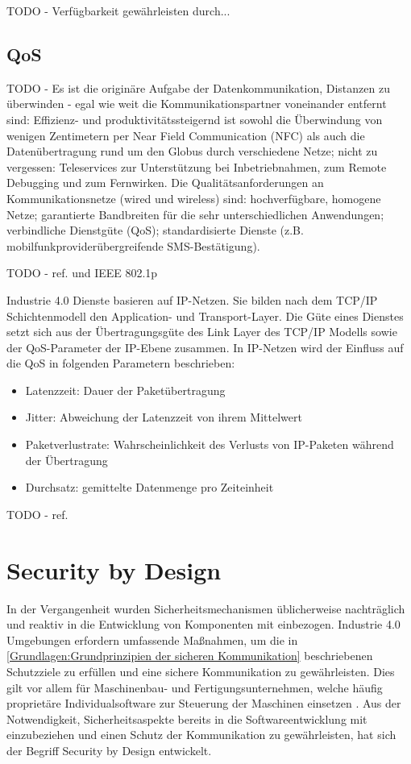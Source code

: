 TODO - Verfügbarkeit gewährleisten durch...

\subsection{\ac{QoS}}
TODO - Es ist die originäre Aufgabe der Datenkommunikation, Distanzen zu überwinden - egal wie weit die Kommunikationspartner voneinander entfernt sind: Effizienz- und produktivitätssteigernd ist sowohl die Überwindung von wenigen Zentimetern per Near Field Communication (NFC) als auch die Datenübertragung rund um den Globus durch verschiedene Netze; nicht zu vergessen: Teleservices zur Unterstützung bei Inbetriebnahmen, zum Remote Debugging und zum Fernwirken. Die Qualitätsanforderungen an Kommunikationsnetze (wired und wireless) sind: hochverfügbare, homogene Netze; garantierte Bandbreiten für die sehr unterschiedlichen Anwendungen; verbindliche Dienstgüte (QoS); standardisierte Dienste (z.B. mobilfunkproviderübergreifende SMS-Bestätigung). 

TODO - ref. \cite{torscht2014} und IEEE 802.1p

Industrie 4.0 Dienste basieren auf IP-Netzen. Sie bilden nach dem TCP/IP Schichtenmodell den Application- und Transport-Layer. Die Güte eines Dienstes setzt sich aus der Übertragungsgüte des Link Layer des TCP/IP Modells sowie der \ac{QoS}-Parameter der IP-Ebene zusammen. In IP-Netzen wird der Einfluss auf die \ac{QoS} in folgenden Parametern beschrieben:
\begin{itemize}
    \item Latenzzeit: Dauer der Paketübertragung
    \item Jitter: Abweichung der Latenzzeit von ihrem Mittelwert
    \item Paketverlustrate: Wahrscheinlichkeit des Verlusts von IP-Paketen während der Übertragung
    \item Durchsatz: gemittelte Datenmenge pro Zeiteinheit
\end{itemize}

TODO - ref. \cite{BMWiSec2016}

\section{Security by Design}
In der Vergangenheit wurden Sicherheitsmechanismen üblicherweise nachträglich und reaktiv in die Entwicklung von Komponenten mit einbezogen. Industrie 4.0 Umgebungen erfordern umfassende Maßnahmen, um die in \autoref{Grundlagen:Grundprinzipien der sicheren Kommunikation} beschriebenen Schutzziele zu erfüllen und eine sichere Kommunikation zu gewährleisten. Dies gilt vor allem für Maschinenbau- und Fertigungsunternehmen, welche häufig proprietäre Individualsoftware zur Steuerung der Maschinen einsetzen \cite{DTAG2016}. Aus der Notwendigkeit, Sicherheitsaspekte bereits in die Softwareentwicklung mit einzubeziehen und einen Schutz der Kommunikation zu gewährleisten, hat sich der Begriff Security by Design entwickelt.

